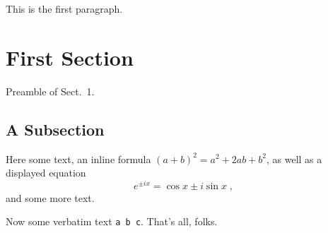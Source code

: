 \documentclass{article}
\begin{document}
This is the first paragraph.

\section{First Section}

Preamble of Sect.~1.

\subsection{A Subsection}

Here some text, an inline formula $(a+b)^2=a^2+2ab+b^2$, as well
as a displayed equation
%
\begin{equation}
e^{\pm ix}=\cos x \pm i \sin x\;,
\end{equation}
%
and some more text.

Now some verbatim text \verb|a b c|.  That's all, folks.
\end{document}

